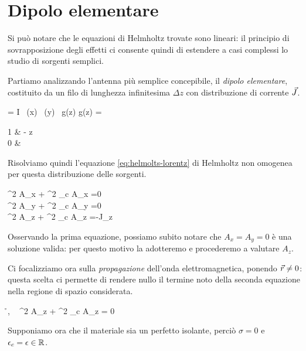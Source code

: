 \section{Dipolo elementare}
Si può notare che le equazioni di Helmholtz trovate sono lineari: il principio di sovrapposizione degli effetti ci consente quindi di estendere a casi complessi lo studio di sorgenti semplici.

\smallbreak
Partiamo analizzando l'antenna più semplice concepibile, il \emph{dipolo elementare}, costituito da un filo di lunghezza infinitesima $\Delta z$ con distribuzione di corrente $\vec{J}$.

\begin{esp} \label{eq:dipolo_elementare}
	\J = I \, \delta(x) \, \delta(y) \, g(z) 
	\quad {} \quad
	g(z) = \begin{cases}
		1 & -  \le z \le {} \\
		0 & 
	\end{cases}
\end{esp}

Risolviamo quindi l'equazione \autoref{eq:helmolts-lorentz} di Helmholtz non omogenea per questa distribuzione delle sorgenti.
\begin{esp*}
	\begin{cases}
		\nabla^2 A_{x} + \omega^2 \mu\epsilon_c A_{x} =0 \\
		\nabla^2 A_{y} + \omega^2 \mu\epsilon_c A_{y} =0 \\
		\nabla^2 A_{z} + \omega^2 \mu\epsilon_c A_{z} =-\mu J_z
	\end{cases}
\end{esp*}

Osservando la prima equazione, possiamo subito notare che $A_x = A_y = 0$ è una soluzione valida: per questo motivo la adotteremo e procederemo a valutare $A_z$.

Ci focalizziamo ora sulla \emph{propagazione} dell'onda elettromagnetica, ponendo $\vec{r} \neq 0$: questa scelta ci permette di rendere nullo il termine noto della seconda equazione nella regione di spazio considerata.

\begin{esp}
	\forall \r {}, ~ \nabla^2 A_{z} + \omega^2 \mu\epsilon_c A_{z} = 0
\end{esp}

\smallbreak
Supponiamo ora che il materiale sia un perfetto isolante, perciò $\sigma=0$ e $\epsilon_c = \epsilon \in \mathbb{R}$.


